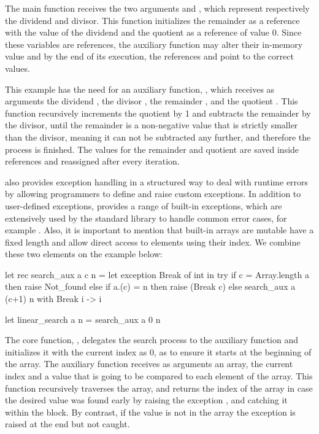 The main function  receives the two arguments  and , which represent respectively
the dividend and divisor. This function initializes the remainder  as a reference with the value of the dividend 
 and the quotient  as a reference of value 0. Since these variables are references, the auxiliary function
may alter their in-memory value and by the end of its execution, the references  and  point to the correct 
values.

This example has the need for an auxiliary function, , which receives as arguments the dividend 
, the divisor , the remainder , and the quotient . This function recursively
increments the quotient by 1 and subtracts the remainder by the divisor, until the remainder 
is a non-negative value that is strictly smaller than the divisor, meaning it can not be subtracted any further, and therefore the 
process is finished. The values for the remainder and quotient are saved inside references and reassigned after every iteration.

\ocaml also provides exception handling in a structured way to deal with runtime errors by allowing programmers to define 
and raise custom exceptions. In addition to user-defined exceptions, \ocaml provides a range of built-in exceptions, which are 
extensively used by the standard library to handle common error cases, for example . Also, it is important to mention that built-in arrays are mutable
have a fixed length and allow direct access to elements using their index. We combine these two elements on the example below:

\begin{ocamlenv}
let rec search_aux a c n =
  let exception Break of int in try
    if c = Array.length a then raise Not_found 
    else if a.(c) = n then raise (Break c) 
    else search_aux a (c+1) n
  with Break i -> i

let linear_search a n = search_aux a 0 n
\end{ocamlenv}
\label{subsec:SearchCode}

The core function, , delegates the search process to the auxiliary function and initializes it with the current
index as 0, as to ensure it starts at the beginning of the array. The auxiliary function  receives as arguments 
an array, the current index and a value that is going to be 
compared to each element of the array. This function recursively traverses the array, and returns the index of the array in case the desired 
value was found early by raising the exception , and catching it within the  block. By contrast, 
if the value is not in the array the exception  is raised at the end but not caught.

